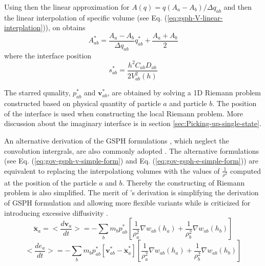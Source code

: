 Using then the linear approximation for $A(q) = q(A_a - A_b)/ \Delta q_{ab}$ and then the linear interpolation of specific volume (see Eq. (\ref{eq:gsph-V-linear-interplation})), on obtains 
\begin{equation}
A_{ab}^{\ast} = \frac{A_a - A_b}{\Delta q_{ab}} q_{ab}^{\ast} + \frac{A_a + A_b}{2}
\label{eq:GSPH-f-interpolation-evaluation}
\end{equation}
where the interface position 
\begin{equation}
s_{ab}^{\ast} = \frac{h^2 C_{ab} D_{ab}}{2V_{ab}^2(h)}
\label{eq:GSPH-f-interpolation-evaluation}
\end{equation}

The starred qunality, $p_{a b}^{\ast}$ and $\textbf{v}_{a b}^{\ast}$, are obtained by solving a 1D Riemann problem constructed based on physical quantity of particle $a$ and particle $b$. The position of the interface is used when constructing the local Riemann problem.
More discussion about the imaginary interface is in section \ref{sec:Picking-up-single-state}.

An alternative derivation of the GSPH formulations \citep{cha2003implementations}, which neglect the convolution intergrals, are also commonly adopted \citep[e.g.][]{puri2014approximate}. The alternative formulations (see Eq. (\ref{eq:gov-gsph-v-simple-form}) and Eq. (\ref{eq:gov-gsph-e-simple-form})) are equivalent to replacing the interpolationg volumes with the values of $\frac{1}{\rho^2}$ computed at the position of the particle $a$ and $b$. Thereby the constructing of Riemann problem is also simplified. The merit of \citet{cha2003implementations}'s derivation is simplifying the derivation of GSPH formulation and allowing more flexible variants while is criticized for introducing excessive diffusivity \citep{borgani2012hydrodynamic}.  
\begin{equation}
\ddot{\textbf{x}}_{a} = <\dfrac{d \textbf{v}_{a}}{dt}>= -\sum_{b} m_{b} p_{a b}^{\ast} \left[\frac{1}{\rho_{a}^2} \nabla w_{a b}(h_{a}) + \frac{1}{\rho_{b}^2} \nabla w_{a b}(h_{b}) \right]
\label{eq:gov-gsph-v-simple-form}
\end{equation}
\begin{equation}
<\dfrac{d e_{a}}{dt}>= - \sum_{b} m_{b} p_{a b}^{\ast} [\textbf{v}_{a b}^{\ast} - \dot{\textbf{x}}_{a}^{\ast}] \left[\frac{1}{\rho_{a}^2} \nabla w_{a b}(h_{a}) + \frac{1}{\rho_{b}^2} \nabla w_{a b}(h_{b}) \right]
\label{eq:gov-gsph-e-simple-form}
\end{equation}

